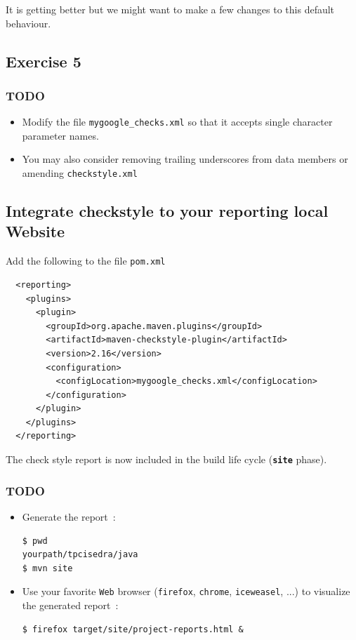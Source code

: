\documentclass{article}
\begin{document}
It is getting better but we might want to make a few changes to this default behaviour.

\subsection{Exercise 5}

\subsubsection{TODO}

\begin{itemize}
\item  Modify the file \texttt{mygoogle\_checks.xml} so that it accepts single character parameter names.
\item You may also consider removing trailing underscores from data members or amending \texttt{checkstyle.xml}
\end{itemize}

\subsection{Integrate checkstyle to your reporting local Website}

Add the following to the file \texttt{pom.xml}
\begin{lstlisting}
  <reporting>
    <plugins>
      <plugin>
        <groupId>org.apache.maven.plugins</groupId>
        <artifactId>maven-checkstyle-plugin</artifactId>
        <version>2.16</version>
        <configuration>
          <configLocation>mygoogle_checks.xml</configLocation>
        </configuration>
      </plugin>
    </plugins>
  </reporting>
\end{lstlisting}

The check style report is now included in the build life cycle (\textbf{\texttt{site}} phase).

\subsubsection{TODO}

\begin {itemize}
\item Generate the report~:
\begin{lstlisting}
$ pwd
yourpath/tpcisedra/java
$ mvn site
\end{lstlisting}
\item Use your favorite \texttt{Web} browser (\texttt{firefox}, \texttt{chrome}, \texttt{iceweasel}, ...) to visualize the generated report~:
\begin{lstlisting}
$ firefox target/site/project-reports.html &
\end{lstlisting}
\end{itemize}
\end{document}
